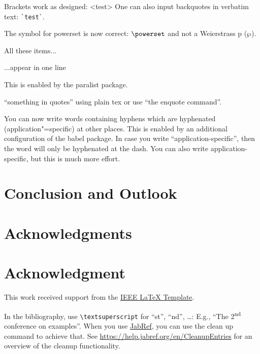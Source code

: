\documentclass[conference]{IEEEtran}
\begin{document}
Brackets work as designed:
<test>
One can also input backquotes in verbatim text: \verb|`test`|.

The symbol for powerset is now correct: $\powerset$ and not a Weierstrass p ($\wp$).

\begin{inparaenum}
  \item All these items...
  \item ...appear in one line
  \item This is enabled by the paralist package.
\end{inparaenum}

``something in quotes'' using plain tex or use \enquote{the enquote command}.

You can now write words containing hyphens which are hyphenated (application"=specific) at other places.
This is enabled by an additional configuration of the babel package.
In case you write \enquote{application-specific}, then the word will only be hyphenated at the dash.
You can also write applica\allowbreak{}tion-specific, but this is much more effort.

\blindtext[4]

\section{Conclusion and Outlook}
\label{sec:outlook}

\blindtext

\ifCLASSOPTIONcompsoc
  \section*{Acknowledgments}
\else
  \section*{Acknowledgment}
\fi

This work received support from the \href{https://latextemplates.github.io/IEEE/}{IEEE LaTeX Template}.


In the bibliography, use \texttt{\textbackslash textsuperscript} for ``st'', ``nd'', \ldots:
E.g., \enquote{The 2\textsuperscript{nd} conference on examples}.
When you use \href{https://www.jabref.org}{JabRef}, you can use the clean up command to achieve that.
See \url{https://help.jabref.org/en/CleanupEntries} for an overview of the cleanup functionality.





\end{document}
